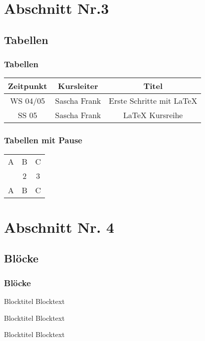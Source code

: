 \documentclass[hyperref={pdfpagelabels=false}]{beamer}
\begin{document}
\section{Abschnitt Nr.3} 
\subsection{Tabellen}
\begin{frame}
\frametitle{Tabellen}
\begin{tabular}{|c|c|c|}
\hline
\textbf{Zeitpunkt} & \textbf{Kursleiter} & \textbf{Titel} \\
\hline
WS 04/05 & Sascha Frank &  Erste Schritte mit \LaTeX{}  \\
\hline
SS 05 & Sascha Frank & \LaTeX{} Kursreihe \\
\hline
\end{tabular}
\end{frame}


\begin{frame}
\frametitle{Tabellen mit Pause}
\begin{tabular}{c c c}
A & B & C \\ 
\pause 
1 & 2 & 3 \\  
\pause 
A & B & C \\ 
\end{tabular} 
\end{frame}


\section{Abschnitt Nr. 4}
\subsection{Bl\"ocke}
\begin{frame}
\frametitle{Bl\"ocke}

\begin{block}{Blocktitel}
Blocktext 
\end{block}

\begin{exampleblock}{Blocktitel}
Blocktext 
\end{exampleblock}


\begin{alertblock}{Blocktitel}
Blocktext 
\end{alertblock}
\end{frame}
\end{document}
